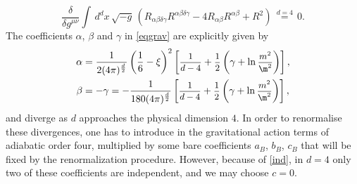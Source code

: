 \documentclass[a4paper,11pt,openright,twoside]{book}
\let\a=\alpha   \let\b=\beta   \let\g=\gamma   \let\d=\delta
\newcommand{\sdfrac}[2]{\mbox{\small$\displaystyle\frac{#1}{#2}$}}
\numberwithin{equation}{section}
\begin{document}
{{{{		\begin{equation}
			\frac{\delta}{\delta g^{\mu\nu}}\int\,d^dx\,\sqrt{-g}\,\left(R_{\a\b\d\g}R^{\a\b\d\g}-4R_{\a\b}R^{\a\b}+R^2\right)\,\overset{d=4}{=}\,0.
		\end{equation}
		The coefficients $\a$, $\b$ and $\g$ in \eqref{eqgrav} are explicitly given by
		\begin{align}
			\alpha&=\frac{1}{2(4\pi)^\frac{d}{2}}\left(\frac{1}{6}-\xi\right)^2\left[\sdfrac{1}{d-4}+\sdfrac{1}{2}\left(\g+\ln\sdfrac{m^2}{\m^2}\right)\right],\\
			\beta&=-\gamma=-\frac{1}{180(4\pi)^\frac{d}{2}}\left[\sdfrac{1}{d-4}+\sdfrac{1}{2}\left(\g+\ln\sdfrac{m^2}{\m^2}\right)\right],
		\end{align}
		and diverge as $d$ approaches the physical dimension $4$. In order to renormalise these divergences, one has to introduce in the gravitational action terms of adiabatic order four, multiplied by some bare coefficients $a_B$, $b_B$, $c_B$ that will be fixed by the renormalization procedure. However, because of \eqref{ind}, in $d=4$ only two of these coefficients are independent, and we may choose $c=0$. 
	}
	{
}}}}
\end{document}
